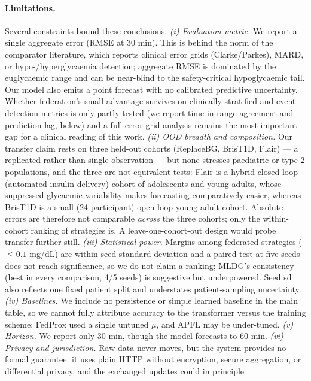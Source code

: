 \documentclass[10pt,letterpaper]{article}
\begin{document}
\paragraph{Limitations.} Several constraints bound these conclusions. \emph{(i)
Evaluation metric.} We report a single aggregate error (RMSE at 30 min). This is
behind the norm of the comparator literature, which reports clinical error grids
(Clarke/Parkes), MARD, or hypo-/hyperglycaemia detection; aggregate RMSE is
dominated by the euglycaemic range and can be near-blind to the safety-critical
hypoglycaemic tail. Our model also emits a point forecast with no calibrated
predictive uncertainty. Whether federation's small advantage survives on
clinically stratified and event-detection metrics is only partly tested (we
report time-in-range agreement and prediction lag, below) and a full error-grid
analysis remains the most important gap for a clinical reading of this work.
\emph{(ii) OOD breadth and composition.} Our transfer claim rests on three
held-out cohorts (ReplaceBG, BrisT1D, Flair) --- a replicated rather than single
observation --- but none stresses paediatric or type-2 populations, and the three
are not equivalent tests: Flair is a hybrid closed-loop (automated insulin
delivery) cohort of adolescents and young adults, whose suppressed glycaemic
variability makes forecasting comparatively easier, whereas BrisT1D is a small
(24-participant) open-loop young-adult cohort. Absolute errors are therefore not
comparable \emph{across} the three cohorts; only the within-cohort ranking of
strategies is. A leave-one-cohort-out design would probe transfer further still. \emph{(iii) Statistical power.} Margins among federated strategies
($\le 0.1$ mg/dL) are within seed standard deviation and a paired test at five
seeds does not reach significance, so we do not claim a ranking; MLDG's
consistency (best in every comparison, 4/5 seeds) is suggestive but underpowered.
Seed sd also reflects one fixed patient split and understates patient-sampling
uncertainty. \emph{(iv) Baselines.} We include no persistence or
simple learned baseline in the main table, so we cannot fully attribute accuracy
to the transformer versus the training scheme; FedProx used a single untuned
$\mu$, and APFL may be under-tuned. \emph{(v) Horizon.} We report only 30 min,
though the model forecasts to 60 min. \emph{(vi) Privacy and jurisdiction.} Raw data never moves, but the system
provides no formal guarantee: it uses plain HTTP without encryption, secure
aggregation, or differential privacy, and the exchanged updates could in principle
\end{document}

